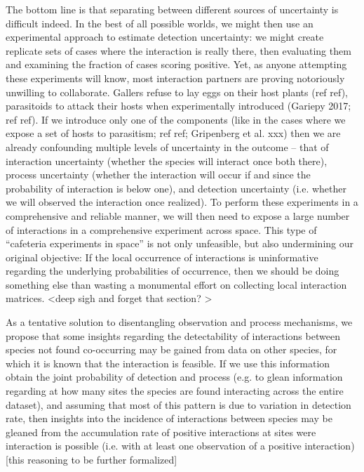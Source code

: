 \documentclass[12pt]{article}
\begin{document}
The bottom line is that separating between different sources of uncertainty is difficult indeed. In the best of all possible worlds, we might then use an experimental approach to estimate detection uncertainty: we might create replicate sets of cases where the interaction is really there, then evaluating them and examining the fraction of cases scoring positive. Yet, as anyone attempting these experiments will know, most interaction partners are proving notoriously unwilling to collaborate. Gallers refuse to lay eggs on their host plants (ref ref), parasitoids to attack their hosts when experimentally introduced (Gariepy 2017; ref ref). If we introduce only one of the components (like in the cases where we expose a set of hosts to parasitism; ref ref; Gripenberg et al. xxx) then we are already confounding multiple levels of uncertainty in the outcome – that of interaction uncertainty (whether the species will interact once both there), process uncertainty (whether the interaction will occur if and since the probability of interaction is below one), and detection uncertainty (i.e. whether we will observed the interaction once realized). To perform these experiments in a comprehensive and reliable manner, we will then need to expose a large number of interactions in a comprehensive experiment across space. This type of “cafeteria experiments in space” is not only unfeasible, but also undermining our original objective: If the local occurrence of interactions is uninformative regarding the underlying probabilities of occurrence, then we should be doing something else than wasting a monumental effort on collecting local interaction matrices. <deep sigh and forget that section? > 

As a tentative solution to disentangling observation and process mechanisms, we propose that some insights regarding the detectability of interactions between species not found co-occurring may be gained from data on other species, for which it is known that the interaction is feasible. If we use this information obtain the joint probability of detection and process (e.g. to glean information regarding at how many sites the species are found interacting across the entire dataset), and assuming that most of this pattern is due to variation in detection rate, then insights into the incidence of interactions between species may be gleaned from the accumulation rate of positive interactions at sites were interaction is possible (i.e. with at least one observation of a positive interaction) [this reasoning to be further formalized]
\end{document}

